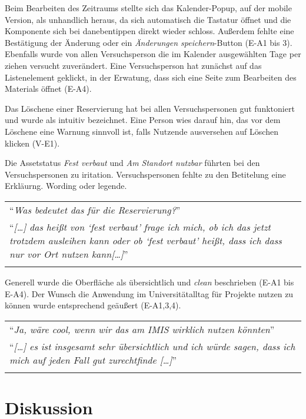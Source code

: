  Beim Bearbeiten des Zeitraums stellte sich das Kalender-Popup, auf der mobile
Version, als unhandlich heraus, da sich automatisch die Tastatur öffnet und die
Komponente sich bei danebentippen direkt wieder schloss. Außerdem fehlte eine
Bestätigung der Änderung oder ein \textit{Änderungen speichern}-Button (E-A1 bis
3). Ebenfalls wurde von allen Versuchsperson die im Kalender ausgewählten Tage
per ziehen versucht zuverändert. Eine Versuchsperson hat zunächst auf das
Listenelement geklickt, in der Erwatung, dass sich eine Seite zum Bearbeiten des
Materials öffnet (E-A4).

Das Löschene einer Reservierung hat bei allen Versuchspersonen gut funktoniert
und wurde als intuitiv bezeichnet. Eine Person wies darauf hin, das vor dem
Löschene eine Warnung sinnvoll ist, falls Nutzende ausversehen auf Löschen
klicken (V-E1). 

Die Assetstatus \textit{Fest verbaut} und \textit{Am Standort nutzbar} führten
bei den Versuchspersonen zu iritation. Versuchspersonen fehlte zu den Betitelung
eine Erkläurng.  Wording oder legende.

\begin{longtable}{p{}} \arrayrulecolor{maincolor}\hline
  \enquote{\textit{Was bedeutet das für die Reservierung?}} \\
  \enquote{\textit{[\dots] das heißt von \enquote{fest verbaut} frage ich mich,
  ob ich das jetzt trotzdem ausleihen kann oder ob \enquote{fest verbaut} heißt,
  dass ich dass nur vor Ort nutzen kann[\dots]}} \\
  \arrayrulecolor{maincolor}\hline
\end{longtable}

Generell wurde die Oberfläche als übersichtlich und \textit{clean} beschrieben
(E-A1 bis E-A4). Der Wunsch die Anwendung im Universitätalltag für Projekte
nutzen zu können wurde entsprechend geäußert (E-A1,3,4).

\begin{longtable}{p{}} \arrayrulecolor{maincolor}\hline
  \enquote{\textit{Ja, wäre cool, wenn wir das am IMIS wirklich nutzen
  könnten}}\\
  \enquote{\textit{[\dots] es ist insgesamt sehr übersichtlich und ich würde
  sagen, dass ich mich auf jeden Fall gut zurechtfinde [\dots]}} \\
  \arrayrulecolor{maincolor}\hline
\end{longtable}

\section{Diskussion}